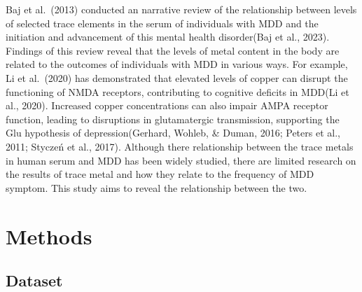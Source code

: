 \documentclass[
  man,floatsintext]{apa6}
\begin{document}
Baj et al.~(2013) conducted an narrative review of the relationship between levels of selected trace elements in the serum of individuals with MDD and the initiation and advancement of this mental health disorder(Baj et al., 2023). Findings of this review reveal that the levels of metal content in the body are related to the outcomes of individuals with MDD in various ways. For example, Li et al.~(2020) has demonstrated that elevated levels of copper can disrupt the functioning of NMDA receptors, contributing to cognitive deficits in MDD(Li et al., 2020). Increased copper concentrations can also impair AMPA receptor function, leading to disruptions in glutamatergic transmission, supporting the Glu hypothesis of depression(Gerhard, Wohleb, \& Duman, 2016; Peters et al., 2011; Styczeń et al., 2017).
Although there relationship between the trace metals in human serum and MDD has been widely studied, there are limited research on the results of trace metal and how they relate to the frequency of MDD symptom. This study aims to reveal the relationship between the two.

\begin{table}
\centering
\caption{\label{tab:racial-demographic}Racial Demographics}
\centering
{}
\end{table}

\hypertarget{methods}{%
\section{Methods}\label{methods}}

\hypertarget{dataset}{%
\subsection{Dataset}\label{dataset}}
\end{document}
